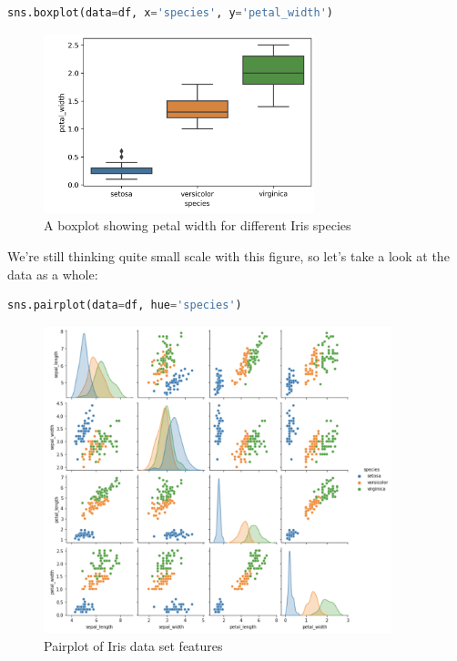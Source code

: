 \documentclass[12pt]{article}
\begin{document}
\begin{lstlisting}[language=Python]
    sns.boxplot(data=df, x='species', y='petal_width')
\end{lstlisting}

\begin{figure}[!h]
    \centering
    \includegraphics[width=0.7\textwidth]{figures/ssIM4.png}
    \caption{A boxplot showing petal width for different Iris species}
\end{figure}

We're still thinking quite small scale with this figure, so let's take a look at the data as a whole:

\begin{lstlisting}[language=Python]
    sns.pairplot(data=df, hue='species')
\end{lstlisting}

\begin{figure}[!h]
    \centering
    \includegraphics[width=0.9\textwidth]{figures/ssIM5.png}
    \caption{Pairplot of Iris data set features}
\end{figure}
\clearpage
\end{document}
